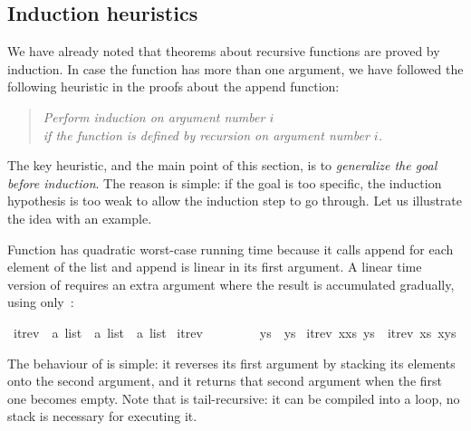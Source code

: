 \begin{isabellebody}
\begin{isamarkuptxt}
\section{Induction heuristics}

We have already noted that theorems about recursive functions are proved by
induction. In case the function has more than one argument, we have followed
the following heuristic in the proofs about the append function:
\begin{quote}
\emph{Perform induction on argument number $i$\\
 if the function is defined by recursion on argument number $i$.}
\end{quote}
The key heuristic, and the main point of this section, is to
\emph{generalize the goal before induction}.
The reason is simple: if the goal is
too specific, the induction hypothesis is too weak to allow the induction
step to go through. Let us illustrate the idea with an example.

Function  has quadratic worst-case running time
because it calls append for each element of the list and
append is linear in its first argument.  A linear time version of
 requires an extra argument where the result is accumulated
gradually, using only~:%
\end{isamarkuptxt}%
\isamarkuptrue%
%
\endisatagproof
{\isafoldproof}%
%
\isadelimproof
%
\endisadelimproof
{}\isamarkupfalse%
\ itrev\ {}{}\ {}{}a\ list\ {}\ {}a\ list\ {}\ {}a\ list{}\ \isanewline
{}itrev\ {}{}\ \ \ \ \ \ \ \ ys\ {}\ ys{}\ {}\isanewline
{}itrev\ {}x{}xs{}\ ys\ {}\ itrev\ xs\ {}x{}ys{}{}%
\begin{isamarkuptext}%
The behaviour of  is simple: it reverses
its first argument by stacking its elements onto the second argument,
and it returns that second argument when the first one becomes
empty. Note that  is tail-recursive: it can be
compiled into a loop, no stack is necessary for executing it.


\end{isamarkuptext}
\end{isabellebody}
